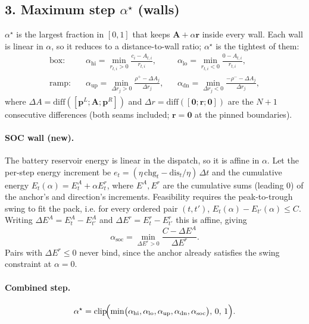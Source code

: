 \documentclass{article}
\begin{document}
\subsection*{3. Maximum step $\alpha^\star$ (walls)}
$\alpha^\star$ is the largest fraction in $[0,1]$ that keeps $\mathbf{A}+\alpha\mathbf{r}$
inside every wall. Each wall is linear in $\alpha$, so it reduces to a
distance-to-wall ratio; $\alpha^\star$ is the tightest of them:
\begin{align}
    \text{box:}\quad
    &\alpha_{\text{hi}}=\min_{r_{t,i}>0}\frac{c_i-A_{t,i}}{r_{t,i}},
     &&\alpha_{\text{lo}}=\min_{r_{t,i}<0}\frac{0-A_{t,i}}{r_{t,i}}, \\[4pt]
    \text{ramp:}\quad
    &\alpha_{\text{up}}=\min_{\Delta r_{j}>0}\frac{\rho^{+}-\Delta A_{j}}{\Delta r_{j}},
     &&\alpha_{\text{dn}}=\min_{\Delta r_{j}<0}\frac{-\rho^{-}-\Delta A_{j}}{\Delta r_{j}},
\end{align}
where $\Delta A=\mathrm{diff}\!\left([\mathbf{p}^L;\mathbf{A};\mathbf{p}^R]\right)$ and
$\Delta r=\mathrm{diff}\!\left([\mathbf{0};\mathbf{r};\mathbf{0}]\right)$ are the
$N{+}1$ consecutive differences (both seams included; $\mathbf{r}=\mathbf{0}$ at the
pinned boundaries).

\paragraph{SOC wall (new).} The battery reservoir energy is linear in the dispatch,
so it is affine in $\alpha$. Let the per-step energy increment be
$e_t=(\eta\,\mathrm{chg}_t-\mathrm{dis}_t/\eta)\,\Delta t$ and the cumulative energy
$E_t(\alpha)=E^{A}_t+\alpha E^{r}_t$, where $E^{A},E^{r}$ are the cumulative sums
(leading $0$) of the anchor's and direction's increments. Feasibility requires the
peak-to-trough swing to fit the pack, i.e. for every ordered pair $(t,t')$,
$E_t(\alpha)-E_{t'}(\alpha)\le C$. Writing $\Delta E^{A}=E^{A}_t-E^{A}_{t'}$ and
$\Delta E^{r}=E^{r}_t-E^{r}_{t'}$ this is affine, giving
\begin{equation}
    \alpha_{\text{soc}}=\min_{\Delta E^{r}>0}\frac{C-\Delta E^{A}}{\Delta E^{r}} .
\end{equation}
Pairs with $\Delta E^{r}\le 0$ never bind, since the anchor already satisfies the
swing constraint at $\alpha=0$.

\paragraph{Combined step.}
\begin{equation}
    \alpha^\star=\operatorname{clip}\!\Bigl(
      \min\bigl(\alpha_{\text{hi}},\alpha_{\text{lo}},
                \alpha_{\text{up}},\alpha_{\text{dn}},
                \alpha_{\text{soc}}\bigr),\,0,\,1\Bigr).
\end{equation}
\end{document}
